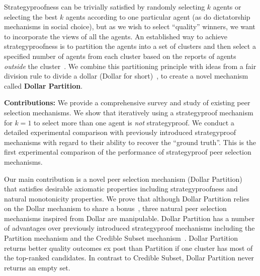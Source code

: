 \documentclass[letterpaper]{article}
\newcommand{\citep}{\cite}
\begin{document}


Strategyproofness can be trivially satisfied by randomly selecting $k$ agents or selecting the best $k$ agents according to one particular agent (as do dictatorship mechanisms in social choice), but as we wish to select ``quality'' winners, we want to incorporate the views of all the agents.
An established way to achieve strategyproofness is to partition the agents into a set of clusters and then select a specified number of agents from each cluster based on the reports of agents \emph{outside} the cluster~\citep{AFPT11a}. We combine this partitioning principle with ideas from a fair division rule to divide a dollar (Dollar for short)~\citep{CMT08a}, to create a novel mechanism called \textbf{Dollar Partition}.

\smallskip
\textbf{Contributions:}\;
We provide a comprehensive survey and study of existing peer selection mechanisms.
We show that iteratively using a strategyproof mechanism for $k=1$ to select more than one agent is \emph{not} strategyproof. We conduct a detailed experimental comparison with previously introduced strategyproof mechanisms with regard to their ability to recover the ``ground truth''. This is the first experimental comparison of the performance of strategyproof peer selection mechanisms.

Our main contribution is a novel peer selection mechanism (Dollar Partition) that satisfies desirable axiomatic properties including strategyproofness and natural monotonicity properties. We prove that although Dollar Partition relies on the Dollar mechanism to share a bonus~\citep{CMT08a}, three natural peer selection mechanisms inspired from Dollar are manipulable. Dollar Partition has a number of advantages over previously introduced strategyproof mechanisms including the Partition mechanism and the Credible Subset mechanism~\citep{KLMP15b}. Dollar Partition returns better quality outcomes ex post than Partition if one cluster has most of the top-ranked candidates. In contrast to Credible Subset, Dollar Partition never returns an empty set.
\end{document}
